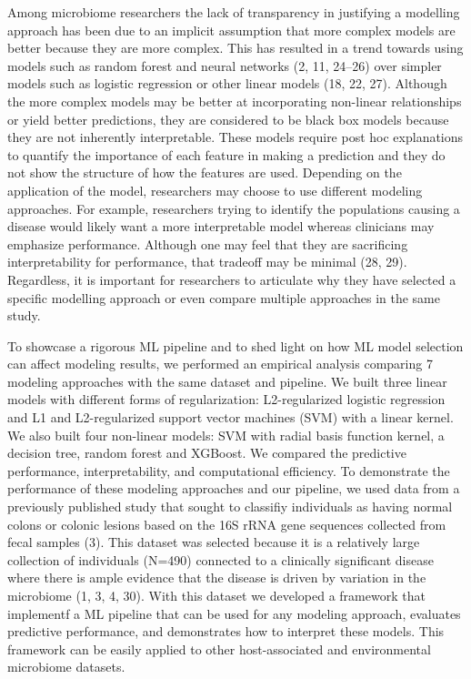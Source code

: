 \documentclass[11pt,]{article}
\begin{document}
Among microbiome researchers the lack of transparency in justifying a
modelling approach has been due to an implicit assumption that more
complex models are better because they are more complex. This has
resulted in a trend towards using models such as random forest and
neural networks (2, 11, 24--26) over simpler models such as logistic
regression or other linear models (18, 22, 27). Although the more
complex models may be better at incorporating non-linear relationships
or yield better predictions, they are considered to be black box models
because they are not inherently interpretable. These models require post
hoc explanations to quantify the importance of each feature in making a
prediction and they do not show the structure of how the features are
used. Depending on the application of the model, researchers may choose
to use different modeling approaches. For example, researchers trying to
identify the populations causing a disease would likely want a more
interpretable model whereas clinicians may emphasize performance.
Although one may feel that they are sacrificing interpretability for
performance, that tradeoff may be minimal (28, 29). Regardless, it is
important for researchers to articulate why they have selected a
specific modelling approach or even compare multiple approaches in the
same study.

To showcase a rigorous ML pipeline and to shed light on how ML model
selection can affect modeling results, we performed an empirical
analysis comparing 7 modeling approaches with the same dataset and
pipeline. We built three linear models with different forms of
regularization: L2-regularized logistic regression and L1 and
L2-regularized support vector machines (SVM) with a linear kernel. We
also built four non-linear models: SVM with radial basis function
kernel, a decision tree, random forest and XGBoost. We compared the
predictive performance, interpretability, and computational efficiency.
To demonstrate the performance of these modeling approaches and our
pipeline, we used data from a previously published study that sought to
classifiy individuals as having normal colons or colonic lesions based
on the 16S rRNA gene sequences collected from fecal samples (3). This
dataset was selected because it is a relatively large collection of
individuals (N=490) connected to a clinically significant disease where
there is ample evidence that the disease is driven by variation in the
microbiome (1, 3, 4, 30). With this dataset we developed a framework
that implementf a ML pipeline that can be used for any modeling
approach, evaluates predictive performance, and demonstrates how to
interpret these models. This framework can be easily applied to other
host-associated and environmental microbiome datasets.
\end{document}
